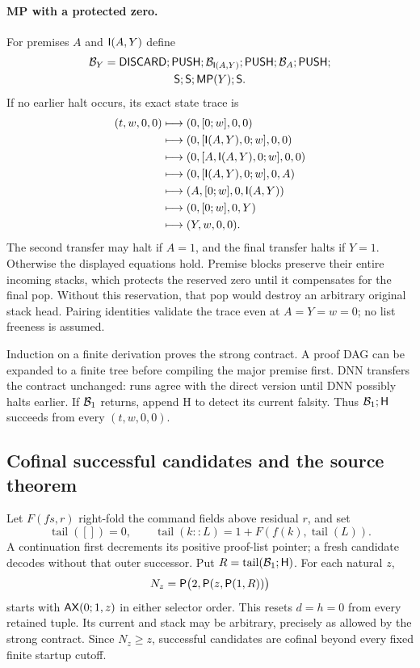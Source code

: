 \paragraph{MP with a protected zero.}
For premises $A$ and $\mathsf I(A,Y)$ define
\begin{multline*}
 \mathcal B_Y=\mathsf{DISCARD};\mathsf{PUSH};
 \mathcal B_{\mathsf I(A,Y)};\mathsf{PUSH};
 \mathcal B_A;\mathsf{PUSH};\\
 \mathsf S;\mathsf S;\mathsf{MP}(Y);\mathsf S.
\end{multline*}
If no earlier halt occurs, its exact state trace is
\begin{align*}
 (t,w,0,0)&\longmapsto(0,[0;w],0,0)\\
 &\longmapsto(0,[\mathsf I(A,Y),0;w],0,0)\\
 &\longmapsto(0,[A,\mathsf I(A,Y),0;w],0,0)\\
 &\longmapsto(0,[\mathsf I(A,Y),0;w],0,A)\\
 &\longmapsto(A,[0;w],0,\mathsf I(A,Y))\\
 &\longmapsto(0,[0;w],0,Y)\\
 &\longmapsto(Y,w,0,0).
\end{align*}
The second transfer may halt if $A=1$, and the final transfer halts
if $Y=1$. Otherwise the displayed equations hold. Premise blocks
preserve their entire incoming stacks, which protects the reserved zero
until it compensates for the final pop. Without this reservation, that
pop would destroy an arbitrary original stack head. Pairing identities
validate the trace even at $A=Y=w=0$; no list freeness is assumed.

Induction on a finite derivation proves the strong contract. A proof
DAG can be expanded to a finite tree before compiling the major premise
first. DNN transfers the contract unchanged: runs agree with the direct
version until DNN possibly halts earlier. If $\mathcal B_1$ returns,
append H to detect its current falsity. Thus $\mathcal B_1;\mathsf H$
succeeds from every $(t,w,0,0)$.

\subsection{Cofinal successful candidates and the source theorem}

Let $F(fs,r)$ right-fold the command fields above residual $r$, and set
\[
 \operatorname{tail}([])=0,\qquad
 \operatorname{tail}(k::L)=1+F(f(k),\operatorname{tail}(L)).
\]
A continuation first decrements its positive proof-list pointer;
a fresh candidate decodes without that outer successor. Put
$R=\operatorname{tail}(\mathcal B_1;\mathsf H)$. For each natural $z$,
\[
 N_z=\mathsf P\bigl(2,\mathsf P(z,\mathsf P(1,R))\bigr)
\]
starts with $\mathsf{AX}(0;1,z)$ in either selector order. This resets
$d=h=0$ from every retained tuple. Its current and stack may be
arbitrary, precisely as allowed by the strong contract. Since
$N_z\geq z$, successful candidates are cofinal beyond every fixed
finite startup cutoff.


